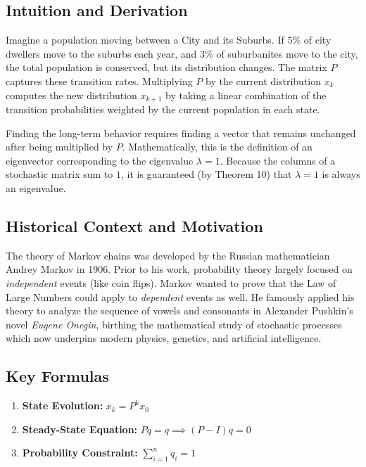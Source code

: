 \documentclass[11pt, letterpaper]{article}
\theoremstyle{definition}
\theoremstyle{remark}
\begin{document}
\subsection{Intuition and Derivation}
Imagine a population moving between a City and its Suburbs. If $5\%$ of city dwellers move to the suburbs each year, and $3\%$ of suburbanites move to the city, the total population is conserved, but its distribution changes. The matrix $P$ captures these transition rates. Multiplying $P$ by the current distribution $x_k$ computes the new distribution $x_{k+1}$ by taking a linear combination of the transition probabilities weighted by the current population in each state. 

Finding the long-term behavior requires finding a vector that remains unchanged after being multiplied by $P$. Mathematically, this is the definition of an eigenvector corresponding to the eigenvalue $\lambda = 1$. Because the columns of a stochastic matrix sum to $1$, it is guaranteed (by Theorem 10) that $\lambda = 1$ is always an eigenvalue.

\subsection{Historical Context and Motivation}
The theory of Markov chains was developed by the Russian mathematician Andrey Markov in 1906. Prior to his work, probability theory largely focused on \textit{independent} events (like coin flips). Markov wanted to prove that the Law of Large Numbers could apply to \textit{dependent} events as well. He famously applied his theory to analyze the sequence of vowels and consonants in Alexander Pushkin's novel \textit{Eugene Onegin}, birthing the mathematical study of stochastic processes which now underpins modern physics, genetics, and artificial intelligence.

\subsection{Key Formulas}
\begin{enumerate}
    \item \textbf{State Evolution:} $x_k = P^k x_0$
    \item \textbf{Steady-State Equation:} $Pq = q \implies (P - I)q = 0$
    \item \textbf{Probability Constraint:} $\sum_{i=1}^n q_i = 1$
\end{enumerate}
\end{document}

